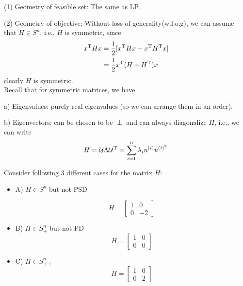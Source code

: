 (1) Geometry of feasible set: The same as LP.

(2) Geometry of objective: Without loss of generality(w.l.o.g), we can assume that $H\in S^n$, i.e., $H$ is symmetric, since
\begin{align*}
x^{{\rm T}}Hx 
&=\frac{1}{2}[x^{{\rm T}}Hx + x^{{\rm T}}H^{{\rm T}}x]\\
&= \frac{1}{2}x^{{\rm T}}(H+H^{{\rm T}})x
\end{align*}
clearly $H$ is symmetric.\\

Recall that for symmetric matrices, we have

a) Eigenvalues: purely real eigenvalues (so we can arrange them in an order).

b) Eigenvectors: can be chosen to be $\perp$ and can always diagonalize $H$, i.e., we can write
$$H = \mathcal{U}\Lambda \mathcal{U}^{{\rm T}}  = \sum^n_{i=1}\lambda_iu^{(i)}u^{(i)^{{\rm T}}}$$

Consider following 3 different cases for the matrix $H$:
\begin{itemize}
	\item A) $H\in S^n$ but not PSD
	
	\begin{equation*}
	H = 
	\begin{bmatrix}
	1&0\\
	0&-2
	\end{bmatrix}
	\end{equation*}
	
	\item B) $H\in S^n_+$ but not PD
	\begin{equation*}
	H = 
	\begin{bmatrix}
	1&0\\
	0&0
	\end{bmatrix}
	\end{equation*}
	
	\item C) $H\in S^n_{++}$
	\begin{equation*}
	H = \begin{bmatrix}
	1&0\\
	0&2
	\end{bmatrix}
	\end{equation*}
\end{itemize}




